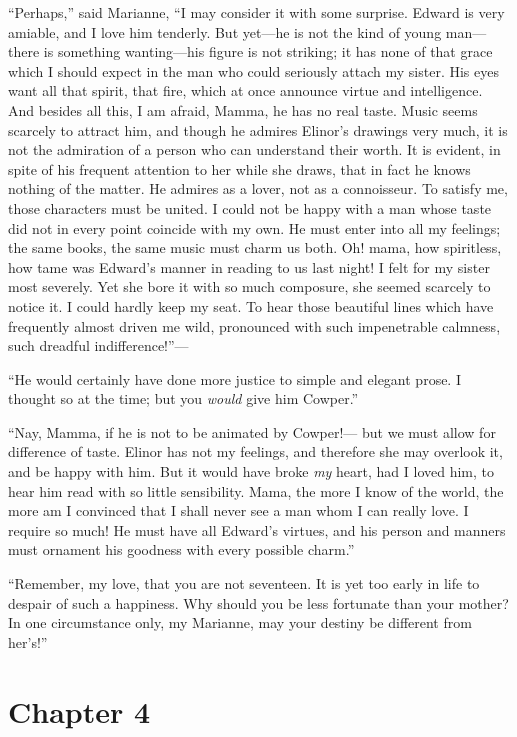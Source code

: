 ``Perhaps,'' said Marianne, ``I may consider it
with some surprise.  Edward is very amiable, and I love
him tenderly.  But yet---he is not the kind of young
man---there is something wanting---his figure is not striking;
it has none of that grace which I should expect
in the man who could seriously attach my sister.
His eyes want all that spirit, that fire, which at once
announce virtue and intelligence.  And besides all this,
I am afraid, Mamma, he has no real taste.  Music seems
scarcely to attract him, and though he admires Elinor's
drawings very much, it is not the admiration of a person
who can understand their worth.  It is evident, in spite of
his frequent attention to her while she draws, that in fact
he knows nothing of the matter.  He admires as a lover,
not as a connoisseur.  To satisfy me, those characters
must be united.  I could not be happy with a man whose
taste did not in every point coincide with my own.
He must enter into all my feelings; the same books,
the same music must charm us both.  Oh! mama, how spiritless,
how tame was Edward's manner in reading to us last night!
I felt for my sister most severely.  Yet she bore it
with so much composure, she seemed scarcely to notice it.
I could hardly keep my seat.  To hear those beautiful lines
which have frequently almost driven me wild, pronounced
with such impenetrable calmness, such dreadful indifference!''---%

``He would certainly have done more justice to
simple and elegant prose.  I thought so at the time;
but you \emph{would} give him Cowper.''

``Nay, Mamma, if he is not to be animated by Cowper!---%
but we must allow for difference of taste.  Elinor has
not my feelings, and therefore she may overlook it, and
be happy with him.  But it would have broke \emph{my} heart,
had I loved him, to hear him read with so little sensibility.
Mama, the more I know of the world, the more am I convinced
that I shall never see a man whom I can really love.
I require so much!  He must have all Edward's virtues,
and his person and manners must ornament his goodness
with every possible charm.''

``Remember, my love, that you are not seventeen.
It is yet too early in life to despair of such a happiness.
Why should you be less fortunate than your mother?  In
one circumstance only, my Marianne, may your destiny be
different from her's!''



\chapter{Chapter 4}


